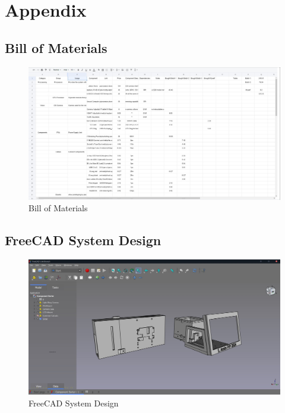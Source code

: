 \newpage
\onecolumn
\section{Appendix}
\subsection*{Bill of Materials}
\begin{figure}[H]
  \centering
  \includegraphics[width=\textwidth]{imgs/appendix/bom.jpg}
  \caption{Bill of Materials}
  \label{app:bom}
\end{figure}
\subsection*{FreeCAD System Design} 
\begin{figure}[H]
  \centering
  \includegraphics[width=\textwidth]{imgs/appendix/systemdesign.jpg}
  \caption{FreeCAD System Design}
  \label{app:freecad}
\end{figure}